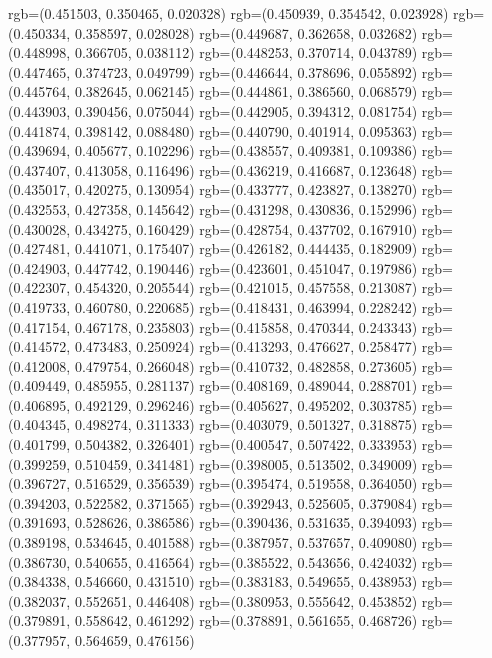 {{{					rgb=(0.451503, 0.350465, 0.020328)
					rgb=(0.450939, 0.354542, 0.023928)
					rgb=(0.450334, 0.358597, 0.028028)
					rgb=(0.449687, 0.362658, 0.032682)
					rgb=(0.448998, 0.366705, 0.038112)
					rgb=(0.448253, 0.370714, 0.043789)
					rgb=(0.447465, 0.374723, 0.049799)
					rgb=(0.446644, 0.378696, 0.055892)
					rgb=(0.445764, 0.382645, 0.062145)
					rgb=(0.444861, 0.386560, 0.068579)
					rgb=(0.443903, 0.390456, 0.075044)
					rgb=(0.442905, 0.394312, 0.081754)
					rgb=(0.441874, 0.398142, 0.088480)
					rgb=(0.440790, 0.401914, 0.095363)
					rgb=(0.439694, 0.405677, 0.102296)
					rgb=(0.438557, 0.409381, 0.109386)
					rgb=(0.437407, 0.413058, 0.116496)
					rgb=(0.436219, 0.416687, 0.123648)
					rgb=(0.435017, 0.420275, 0.130954)
					rgb=(0.433777, 0.423827, 0.138270)
					rgb=(0.432553, 0.427358, 0.145642)
					rgb=(0.431298, 0.430836, 0.152996)
					rgb=(0.430028, 0.434275, 0.160429)
					rgb=(0.428754, 0.437702, 0.167910)
					rgb=(0.427481, 0.441071, 0.175407)
					rgb=(0.426182, 0.444435, 0.182909)
					rgb=(0.424903, 0.447742, 0.190446)
					rgb=(0.423601, 0.451047, 0.197986)
					rgb=(0.422307, 0.454320, 0.205544)
					rgb=(0.421015, 0.457558, 0.213087)
					rgb=(0.419733, 0.460780, 0.220685)
					rgb=(0.418431, 0.463994, 0.228242)
					rgb=(0.417154, 0.467178, 0.235803)
					rgb=(0.415858, 0.470344, 0.243343)
					rgb=(0.414572, 0.473483, 0.250924)
					rgb=(0.413293, 0.476627, 0.258477)
					rgb=(0.412008, 0.479754, 0.266048)
					rgb=(0.410732, 0.482858, 0.273605)
					rgb=(0.409449, 0.485955, 0.281137)
					rgb=(0.408169, 0.489044, 0.288701)
					rgb=(0.406895, 0.492129, 0.296246)
					rgb=(0.405627, 0.495202, 0.303785)
					rgb=(0.404345, 0.498274, 0.311333)
					rgb=(0.403079, 0.501327, 0.318875)
					rgb=(0.401799, 0.504382, 0.326401)
					rgb=(0.400547, 0.507422, 0.333953)
					rgb=(0.399259, 0.510459, 0.341481)
					rgb=(0.398005, 0.513502, 0.349009)
					rgb=(0.396727, 0.516529, 0.356539)
					rgb=(0.395474, 0.519558, 0.364050)
					rgb=(0.394203, 0.522582, 0.371565)
					rgb=(0.392943, 0.525605, 0.379084)
					rgb=(0.391693, 0.528626, 0.386586)
					rgb=(0.390436, 0.531635, 0.394093)
					rgb=(0.389198, 0.534645, 0.401588)
					rgb=(0.387957, 0.537657, 0.409080)
					rgb=(0.386730, 0.540655, 0.416564)
					rgb=(0.385522, 0.543656, 0.424032)
					rgb=(0.384338, 0.546660, 0.431510)
					rgb=(0.383183, 0.549655, 0.438953)
					rgb=(0.382037, 0.552651, 0.446408)
					rgb=(0.380953, 0.555642, 0.453852)
					rgb=(0.379891, 0.558642, 0.461292)
					rgb=(0.378891, 0.561655, 0.468726)
					rgb=(0.377957, 0.564659, 0.476156)
}}}

